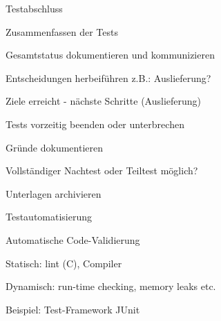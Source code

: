 \documentclass[a4paper]{article}
\begin{document}
\begin{multicols}{3}

  Testabschluss
  \begin{itemize*}
    \item Zusammenfassen der Tests
    \item Gesamtstatus dokumentieren und kommunizieren
    \item Entscheidungen herbeiführen z.B.: Auslieferung?
    \begin{itemize*}
      \item Ziele erreicht - nächste Schritte (Auslieferung)
      \item Tests vorzeitig beenden oder unterbrechen
      \item Gründe dokumentieren
      \item Vollständiger Nachtest oder Teiltest möglich?
    \end{itemize*}
    \item Unterlagen archivieren
  \end{itemize*}

  Testautomatisierung
  \begin{itemize*}
    \item Automatische Code-Validierung
    \begin{itemize*}
      \item Statisch: lint (C), Compiler
      \item Dynamisch: run-time checking, memory leaks etc.
    \end{itemize*}
    \item Beispiel: Test-Framework JUnit
  \end{itemize*}


\end{multicols}
\end{document}
